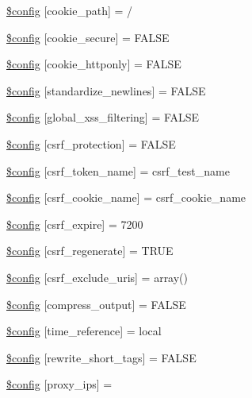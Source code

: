 \begin{DoxyCompactItemize}
\item 
\hyperlink{config_8php_a176dd309a2f62188ff78be8a2b98eaaf}{\$config} \mbox{[}\textquotesingle{}cookie\+\_\+path\textquotesingle{}\mbox{]} = \textquotesingle{}/\textquotesingle{}
\item 
\hyperlink{config_8php_adbf726991c50cda563404e5162b11977}{\$config} \mbox{[}\textquotesingle{}cookie\+\_\+secure\textquotesingle{}\mbox{]} = F\+A\+L\+SE
\item 
\hyperlink{config_8php_adad0e1a96179de1af337c7b88104e27e}{\$config} \mbox{[}\textquotesingle{}cookie\+\_\+httponly\textquotesingle{}\mbox{]} = F\+A\+L\+SE
\item 
\hyperlink{config_8php_a9e3f88fcf538f3a5fc535968b36e0193}{\$config} \mbox{[}\textquotesingle{}standardize\+\_\+newlines\textquotesingle{}\mbox{]} = F\+A\+L\+SE
\item 
\hyperlink{config_8php_ab45064f0f597502748a1f241fc7ca8eb}{\$config} \mbox{[}\textquotesingle{}global\+\_\+xss\+\_\+filtering\textquotesingle{}\mbox{]} = F\+A\+L\+SE
\item 
\hyperlink{config_8php_afa3283fe6e347ec07dc24a3bddd24b9e}{\$config} \mbox{[}\textquotesingle{}csrf\+\_\+protection\textquotesingle{}\mbox{]} = F\+A\+L\+SE
\item 
\hyperlink{config_8php_ac474c904aeb13f7dc1cb5430a8fc9e63}{\$config} \mbox{[}\textquotesingle{}csrf\+\_\+token\+\_\+name\textquotesingle{}\mbox{]} = \textquotesingle{}csrf\+\_\+test\+\_\+name\textquotesingle{}
\item 
\hyperlink{config_8php_ac049a8e8df7d6ac2e8f16110f3a34709}{\$config} \mbox{[}\textquotesingle{}csrf\+\_\+cookie\+\_\+name\textquotesingle{}\mbox{]} = \textquotesingle{}csrf\+\_\+cookie\+\_\+name\textquotesingle{}
\item 
\hyperlink{config_8php_af11d827f96f9386ca7c873c2463df384}{\$config} \mbox{[}\textquotesingle{}csrf\+\_\+expire\textquotesingle{}\mbox{]} = 7200
\item 
\hyperlink{config_8php_ac0706e1569f781ed857ecc183f084c1a}{\$config} \mbox{[}\textquotesingle{}csrf\+\_\+regenerate\textquotesingle{}\mbox{]} = T\+R\+UE
\item 
\hyperlink{config_8php_a4fa2da3e7d0304b3b81e8d9eace08891}{\$config} \mbox{[}\textquotesingle{}csrf\+\_\+exclude\+\_\+uris\textquotesingle{}\mbox{]} = array()
\item 
\hyperlink{config_8php_a3a676836543f524feb59e3bb8ea1664c}{\$config} \mbox{[}\textquotesingle{}compress\+\_\+output\textquotesingle{}\mbox{]} = F\+A\+L\+SE
\item 
\hyperlink{config_8php_aff823b412a71ef1f2e5994cfef7a3388}{\$config} \mbox{[}\textquotesingle{}time\+\_\+reference\textquotesingle{}\mbox{]} = \textquotesingle{}local\textquotesingle{}
\item 
\hyperlink{config_8php_a2e70aedb292bc2c7ffe41375675f82a4}{\$config} \mbox{[}\textquotesingle{}rewrite\+\_\+short\+\_\+tags\textquotesingle{}\mbox{]} = F\+A\+L\+SE
\item 
\hyperlink{config_8php_af32d3a811414b59e8e0fb72528fccc4f}{\$config} \mbox{[}\textquotesingle{}proxy\+\_\+ips\textquotesingle{}\mbox{]} = \textquotesingle{}\textquotesingle{}
\end{DoxyCompactItemize}


